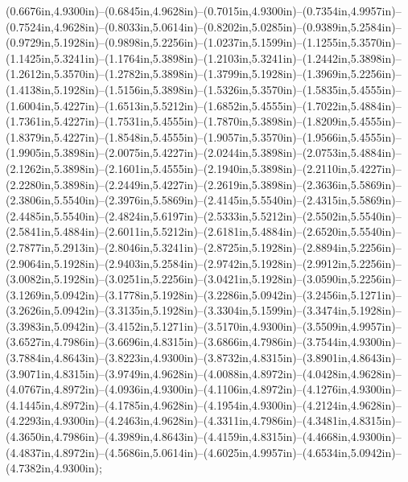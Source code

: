 (0.6676in,4.9300in)--(0.6845in,4.9628in)--(0.7015in,4.9300in)--(0.7354in,4.9957in)--(0.7524in,4.9628in)--(0.8033in,5.0614in)--(0.8202in,5.0285in)--(0.9389in,5.2584in)--(0.9729in,5.1928in)--(0.9898in,5.2256in)--(1.0237in,5.1599in)--(1.1255in,5.3570in)--(1.1425in,5.3241in)--(1.1764in,5.3898in)--(1.2103in,5.3241in)--(1.2442in,5.3898in)--(1.2612in,5.3570in)--(1.2782in,5.3898in)--(1.3799in,5.1928in)--(1.3969in,5.2256in)--(1.4138in,5.1928in)--(1.5156in,5.3898in)--(1.5326in,5.3570in)--(1.5835in,5.4555in)--(1.6004in,5.4227in)--(1.6513in,5.5212in)--(1.6852in,5.4555in)--(1.7022in,5.4884in)--(1.7361in,5.4227in)--(1.7531in,5.4555in)--(1.7870in,5.3898in)--(1.8209in,5.4555in)--(1.8379in,5.4227in)--(1.8548in,5.4555in)--(1.9057in,5.3570in)--(1.9566in,5.4555in)--(1.9905in,5.3898in)--(2.0075in,5.4227in)--(2.0244in,5.3898in)--(2.0753in,5.4884in)--(2.1262in,5.3898in)--(2.1601in,5.4555in)--(2.1940in,5.3898in)--(2.2110in,5.4227in)--(2.2280in,5.3898in)--(2.2449in,5.4227in)--(2.2619in,5.3898in)--(2.3636in,5.5869in)--(2.3806in,5.5540in)--(2.3976in,5.5869in)--(2.4145in,5.5540in)--(2.4315in,5.5869in)--(2.4485in,5.5540in)--(2.4824in,5.6197in)--(2.5333in,5.5212in)--(2.5502in,5.5540in)--(2.5841in,5.4884in)--(2.6011in,5.5212in)--(2.6181in,5.4884in)--(2.6520in,5.5540in)--(2.7877in,5.2913in)--(2.8046in,5.3241in)--(2.8725in,5.1928in)--(2.8894in,5.2256in)--(2.9064in,5.1928in)--(2.9403in,5.2584in)--(2.9742in,5.1928in)--(2.9912in,5.2256in)--(3.0082in,5.1928in)--(3.0251in,5.2256in)--(3.0421in,5.1928in)--(3.0590in,5.2256in)--(3.1269in,5.0942in)--(3.1778in,5.1928in)--(3.2286in,5.0942in)--(3.2456in,5.1271in)--(3.2626in,5.0942in)--(3.3135in,5.1928in)--(3.3304in,5.1599in)--(3.3474in,5.1928in)--(3.3983in,5.0942in)--(3.4152in,5.1271in)--(3.5170in,4.9300in)--(3.5509in,4.9957in)--(3.6527in,4.7986in)--(3.6696in,4.8315in)--(3.6866in,4.7986in)--(3.7544in,4.9300in)--(3.7884in,4.8643in)--(3.8223in,4.9300in)--(3.8732in,4.8315in)--(3.8901in,4.8643in)--(3.9071in,4.8315in)--(3.9749in,4.9628in)--(4.0088in,4.8972in)--(4.0428in,4.9628in)--(4.0767in,4.8972in)--(4.0936in,4.9300in)--(4.1106in,4.8972in)--(4.1276in,4.9300in)--(4.1445in,4.8972in)--(4.1785in,4.9628in)--(4.1954in,4.9300in)--(4.2124in,4.9628in)--(4.2293in,4.9300in)--(4.2463in,4.9628in)--(4.3311in,4.7986in)--(4.3481in,4.8315in)--(4.3650in,4.7986in)--(4.3989in,4.8643in)--(4.4159in,4.8315in)--(4.4668in,4.9300in)--(4.4837in,4.8972in)--(4.5686in,5.0614in)--(4.6025in,4.9957in)--(4.6534in,5.0942in)--(4.7382in,4.9300in);
